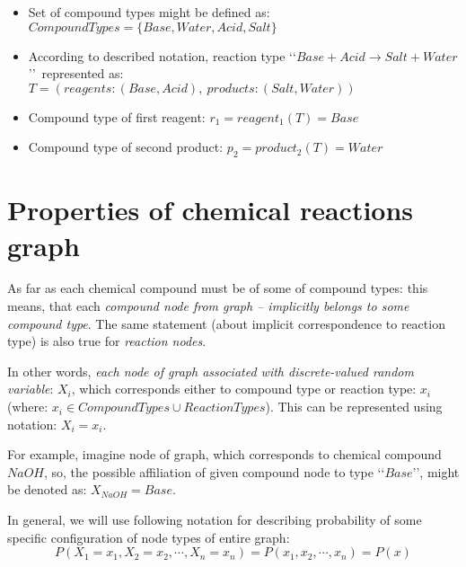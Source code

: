\documentclass[10pt]{article}
\begin{document}
\begin{tcolorbox}[colback=gray!5,colframe=gray!70,title=Examples of usage of described notation,left=7pt, right=7pt]
    \begin{itemize}
        \item Set of compound types might be defined as: $CompoundTypes = \{Base, Water, Acid, Salt\}$
        \item According to described notation, reaction type \lq \lq$Base + Acid \rightarrow Salt + Water$\rq \rq \ represented as: \\
                $T = (reagents: (Base, Acid),\ products: (Salt, Water))$
        \item Compound type of first reagent: $r_1 = reagent_1(T) = Base$
        \item Compound type of second product: $p_2 = product_2(T) = Water$
    \end{itemize}
\end{tcolorbox}

\section{Properties of chemical reactions graph}

As far as each chemical compound must be of some of compound types: this means, that each \emph{compound node from graph -- implicitly belongs to some compound type}. The same statement (about implicit correspondence to reaction type) is also true for \emph{reaction nodes}. 

In other words, \emph{each node of graph associated with discrete-valued random variable}: $X_i$, which corresponds either to compound type or reaction type: $x_i$ (where: $x_i \in CompoundTypes \cup ReactionTypes$). This can be represented using notation: $X_i = x_i$. 

\begin{tcolorbox}[colback=gray!5,colframe=gray!70,title=Examples of usage of described notation,left=7pt, right=7pt]
For example, imagine node of graph, which corresponds to chemical compound $NaOH$, so, the possible affiliation of given compound node to type \lq \lq $Base$\rq \rq, might be denoted as: $X_{NaOH} = Base$.
\end{tcolorbox}

In general, we will use following notation for describing probability of some specific configuration of node types of entire graph: 
\begin{equation} \label{eq:probability_notation}
P(X_1 = x_1, X_2 = x_2, \cdots , X_n = x_n) = P(x_1, x_2, \cdots , x_n) = P(x)
\end{equation}
\end{document}
